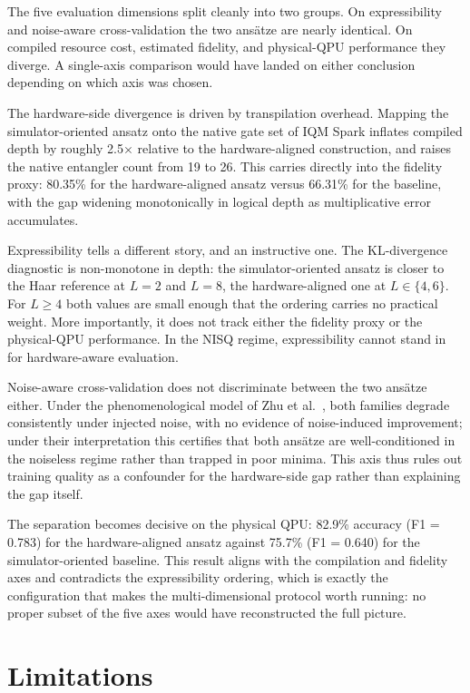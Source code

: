 \documentclass[11pt]{article}
\begin{document}
The five evaluation dimensions split cleanly into two groups. On expressibility and noise-aware cross-validation the two ansätze are nearly identical. On compiled resource cost, estimated fidelity, and physical-QPU performance they diverge. A single-axis comparison would have landed on either conclusion depending on which axis was chosen.

The hardware-side divergence is driven by transpilation overhead. Mapping the simulator-oriented ansatz onto the native gate set of IQM Spark inflates compiled depth by roughly 2.5$\times$ relative to the hardware-aligned construction, and raises the native entangler count from 19 to 26. This carries directly into the fidelity proxy: 80.35\% for the hardware-aligned ansatz versus 66.31\% for the baseline, with the gap widening monotonically in logical depth as multiplicative error accumulates.

Expressibility tells a different story, and an instructive one. The KL-divergence diagnostic is non-monotone in depth: the simulator-oriented ansatz is closer to the Haar reference at $L=2$ and $L=8$, the hardware-aligned one at $L \in \{4, 6\}$. For $L \geq 4$ both values are small enough that the ordering carries no practical weight. More importantly, it does not track either the fidelity proxy or the physical-QPU performance. In the NISQ regime, expressibility cannot stand in for hardware-aware evaluation.

Noise-aware cross-validation does not discriminate between the two ansätze either. Under the phenomenological model of Zhu et al.~\cite{zhu2026}, both families degrade consistently under injected noise, with no evidence of noise-induced improvement; under their interpretation this certifies that both ansätze are well-conditioned in the noiseless regime rather than trapped in poor minima. This axis thus rules out training quality as a confounder for the hardware-side gap rather than explaining the gap itself.

The separation becomes decisive on the physical QPU: 82.9\% accuracy (F1 = 0.783) for the hardware-aligned ansatz against 75.7\% (F1 = 0.640) for the simulator-oriented baseline. This result aligns with the compilation and fidelity axes and contradicts the expressibility ordering, which is exactly the configuration that makes the multi-dimensional protocol worth running: no proper subset of the five axes would have reconstructed the full picture.

\section{Limitations}
\end{document}
